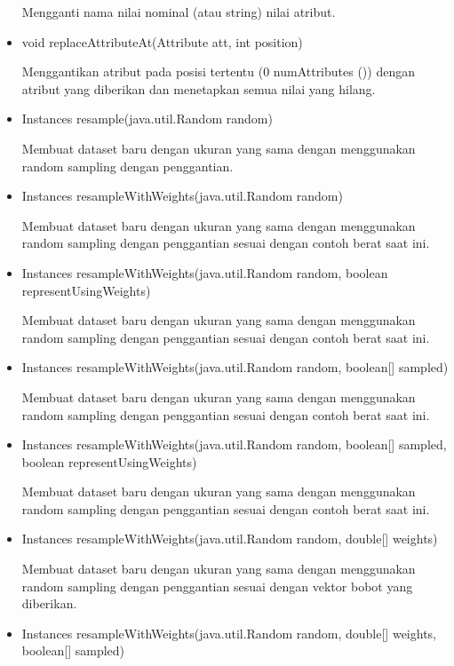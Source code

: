 \begin{itemize}
	Mengganti nama nilai nominal (atau string) nilai atribut.
	
	\item void replaceAttributeAt(Attribute att, int position)
	
	Menggantikan atribut pada posisi tertentu (0 numAttributes ()) dengan atribut yang diberikan dan menetapkan semua nilai yang hilang.
	
	\item Instances resample(java.util.Random random)
	
	Membuat dataset baru dengan ukuran yang sama dengan menggunakan random sampling dengan penggantian.
	
	\item Instances resampleWithWeights(java.util.Random random)
	
	Membuat dataset baru dengan ukuran yang sama dengan menggunakan random sampling dengan penggantian sesuai dengan contoh berat saat ini.
	
	\item Instances resampleWithWeights(java.util.Random random, boolean representUsingWeights)
	
	Membuat dataset baru dengan ukuran yang sama dengan menggunakan random sampling dengan penggantian sesuai dengan contoh berat saat ini.
	
	\item Instances resampleWithWeights(java.util.Random random, boolean[] sampled)
	
	Membuat dataset baru dengan ukuran yang sama dengan menggunakan random sampling dengan penggantian sesuai dengan contoh berat saat ini.
	
	\item Instances resampleWithWeights(java.util.Random random, boolean[] sampled, boolean representUsingWeights)
	
	Membuat dataset baru dengan ukuran yang sama dengan menggunakan random sampling dengan penggantian sesuai dengan contoh berat saat ini.
	
	\item Instances resampleWithWeights(java.util.Random random, double[] weights)
	
	Membuat dataset baru dengan ukuran yang sama dengan menggunakan random sampling dengan penggantian sesuai dengan vektor bobot yang diberikan.
	
	\item Instances resampleWithWeights(java.util.Random random, double[] weights, boolean[] sampled)
	

\end{itemize}
